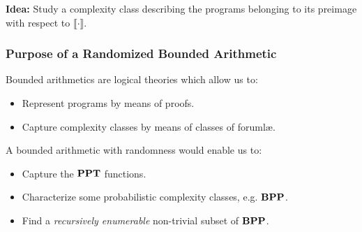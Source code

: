 \documentclass[xcolor={x11names}]{beamer}
\begin{document}
\begin{frame}
\begin{tikzpicture}[thick]

  \end{tikzpicture}

  \medskip

{  {\bf Idea:} Study a complexity class describing the programs belonging to its preimage with respect to $\llbracket \cdot \rrbracket$.
}
\end{frame}

\begin{frame}
\frametitle{Purpose of a Randomized Bounded Arithmetic}

Bounded arithmetics are logical theories which allow us to:

\medskip
\begin{itemize}
\item Represent programs by means of proofs.
\item Capture complexity classes by means of classes of foruml\ae{}.
\end{itemize}
\pause
\bigskip

A bounded arithmetic with randomness would enable us to:

\medskip
\begin{itemize}
\item Capture the $\PPT$ functions.
\item Characterize some probabilistic complexity classes, e.g. $\BPP$.
\item Find a \emph{recursively enumerable} non-trivial subset of $\BPP$.
\end{itemize}


\end{frame}
\end{document}
